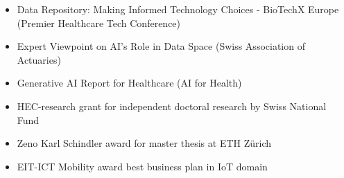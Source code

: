 \vspace{-0.1cm}
\begin{itemize}[leftmargin=*]
	\item Data Repository: Making Informed Technology Choices - BioTechX Europe (Premier Healthcare Tech Conference)
	\vspace{-0.25cm}
	\item Expert Viewpoint on AI's Role in Data Space (Swiss Association of Actuaries)
	\vspace{-0.25cm}
	\item Generative AI Report for Healthcare (AI for Health)
	\vspace{-0.25cm}
	\item HEC-research grant for independent doctoral research by Swiss National Fund
	\vspace{-0.25cm}
	\item Zeno Karl Schindler award for master thesis at ETH Zürich
	\vspace{-0.25cm}
	\item EIT-ICT Mobility award best business plan in IoT domain
	
	\vspace{-0.1cm}
\end{itemize}